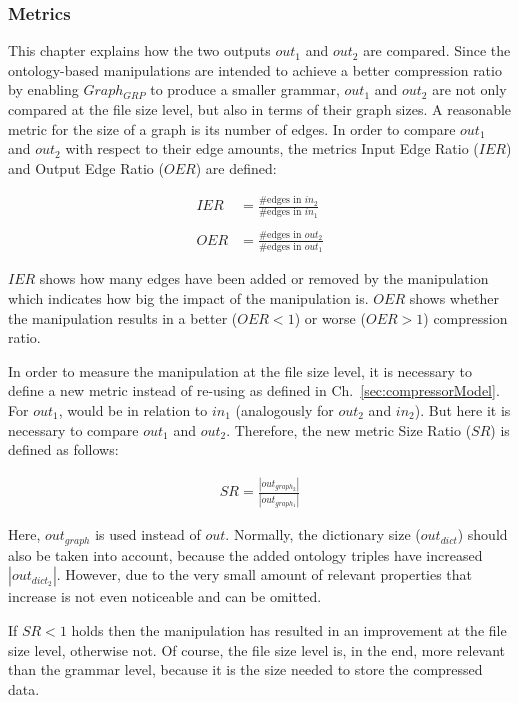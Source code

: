 \subsubsection{Metrics}

This chapter explains how the two outputs $out_1$ and $out_2$ are compared. Since the ontology-based manipulations are intended to achieve a better compression ratio by enabling $Graph_{GRP}$ to produce a smaller grammar, $out_1$ and $out_2$ are not only compared at the file size level, but also in terms of their graph sizes. A reasonable metric for the size of a graph is its number of edges. In order to compare $out_1$ and $out_2$ with respect to their edge amounts, the metrics Input Edge Ratio ($IER$) and Output Edge Ratio ($OER$)  are defined: 

\begin{align*}
IER&=\frac {\text{\#edges in } in_2} {\text{\#edges in  } in_1}
\\\\
OER&=\frac {\text{\#edges in } out_2} {\text{\#edges in } out_1}
 \end{align*}
 
$IER$ shows how many edges have been added or removed by the manipulation which indicates how big the impact of the manipulation is. $OER$  shows whether the manipulation results in a better ($OER<1$) or worse ($OER>1$) compression ratio.

In order to measure the manipulation at the file size level, it is necessary to define a new metric instead of re-using  as defined in Ch.~\ref{sec:compressorModel}. For $out_1$,  would be in relation to $in_1$ (analogously for $out_2$ and $in_2$). But here it is necessary to compare $out_1$ and $out_2$. Therefore, the new metric Size Ratio ($SR$) is defined as follows:

\begin{align*} 
SR=\frac {|out_{graph_2}|} {|out_{graph_1}|}
\end{align*}

Here, $out_{graph}$ is used instead of $out$. Normally, the dictionary size ($out_{dict}$) should also be taken into account, because the added ontology triples have increased $|out_{dict_2}|$. However, due to the very small amount of relevant properties that increase is not even noticeable and can be omitted. 

If $SR<1$ holds then the manipulation has resulted in an improvement at the file size level, otherwise not. Of course, the file size level is, in the end, more relevant than the grammar level, because it is the size needed to store the compressed data.

